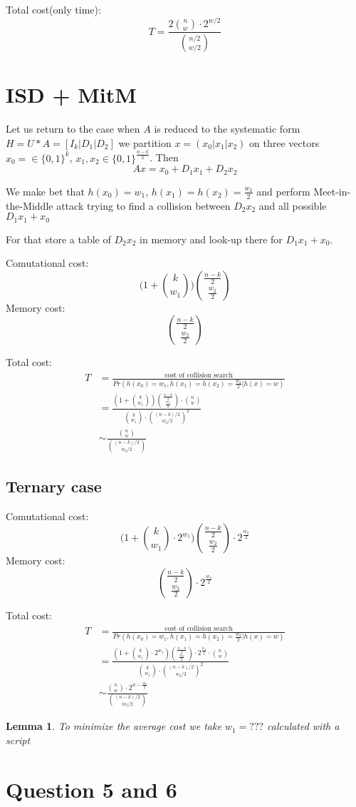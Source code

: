 \documentclass[12pt]{article}
\newtheorem{lemma}{Lemma}
\begin{document}
Total cost(only time):
\[
  T = \frac{2\binom{n}{w} \cdot 2^{w/2}}{\binom{n/2}{w/2}}
\]
\section{ISD + MitM}
Let us return to the case when $A$ is reduced to the systematic form $H = U * A = [I_{k}| D_1 | D_2]$ we partition $x = (x_0 |x_1 |x_2)$ on three vectors $x_0 = \in \{0,1\}^{k}$, $x_1,x_2 \in \{0,1\}^{\frac{n-k}{2}}$. Then
\[
  Ax = x_0 + D_1x_1 + D_2x_2
\]

We make bet that $h(x_0) = w_1$, $h(x_1) = h(x_2) = \frac{w_2}{2}$ and perform Meet-in-the-Middle attack trying to find a collision between $D_2x_2$ and all possible $D_1x_1 + x_0$

For that store a table of $D_2x_2$ in memory and look-up there for $D_1x_1 + x_0$.

Comutational cost:
\[
\Big(1+ \binom{k}{w_1}\Big)\binom{\frac{n-k}{2}}{\frac{w_2}{2}}
\]
Memory cost:
\[
\binom{\frac{n-k}{2}}{\frac{w_2}{2}}
\]

Total cost:
\[
\begin{split}
  T & = \frac{\text{cost of collision search}}{Pr(h(x_0) = w_1, h(x_1) = h(x_2) = \frac{w_2}{2} | h(x) = w)} \\
  & = \frac{(1+ \binom{k}{w_1})\binom{\frac{n-k}{2}}{\frac{w_2}{2}}\cdot \binom{n}{w}}{\binom{k}{w_1} \cdot \binom{(n-k)/2}{w_2/2}^{2}} \\
  & \sim \frac{\binom{n}{w}}{\binom{(n-k)/2}{w_2/2}}
\end{split}
\]
\subsection{Ternary case}
Comutational cost:
\[
\Big(1+ \binom{k}{w_1} \cdot 2^{w_1}\Big)\binom{\frac{n-k}{2}}{\frac{w_2}{2}} \cdot 2^{\frac{w_2}{2}}
\]
Memory cost:
\[
\binom{\frac{n-k}{2}}{\frac{w_2}{2}} \cdot 2^{\frac{w_2}{2}}
\]

Total cost:
\[
\begin{split}
  T & = \frac{\text{cost of collision search}}{Pr(h(x_0) = w_1, h(x_1) = h(x_2) = \frac{w_2}{2} | h(x) = w)} \\
  & = \frac{(1+ \binom{k}{w_1}\cdot 2^{w_1})\binom{\frac{n-k}{2}}{\frac{w_2}{2}}\cdot 2^{\frac{w_2}{2}}\cdot \binom{n}{w}}{\binom{k}{w_1} \cdot \binom{(n-k)/2}{w_2/2}^{2}} \\
  & \sim \frac{\binom{n}{w} \cdot 2^{w - \frac{w_2}{2}}}{\binom{(n-k)/2}{w_2/2}}
\end{split}
\]
\begin{lemma}
To minimize the average cost we take $w_1 = ???$ calculated with a script
\end{lemma}
\section{Question 5 and 6}




\end{document}
